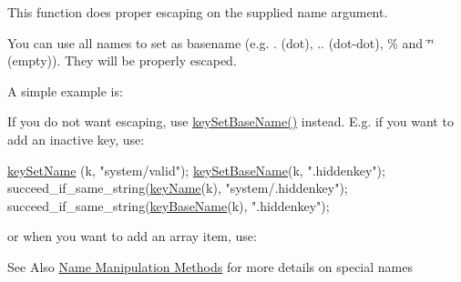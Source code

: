 This function does proper escaping on the supplied name argument.

You can use all names to set as basename (e.\-g. . (dot), .. (dot-\/dot), \% and \char`\"{}\char`\"{} (empty)). They will be properly escaped.

A simple example is\-: 
 If you do not want escaping, use \hyperlink{group__keyname_ga6e804bd453f98c28b0ff51430d1df407}{key\-Set\-Base\-Name()} instead. E.\-g. if you want to add an inactive key, use\-: 
\begin{DoxyCodeInclude}
        \hyperlink{group__keyname_ga7699091610e7f3f43d2949514a4b35d9}{keySetName} (k, \textcolor{stringliteral}{"system/valid"});
        \hyperlink{group__keyname_ga6e804bd453f98c28b0ff51430d1df407}{keySetBaseName}(k, \textcolor{stringliteral}{".hiddenkey"});
        succeed\_if\_same\_string(\hyperlink{group__keyname_ga8e805c726a60da921d3736cda7813513}{keyName}(k), \textcolor{stringliteral}{"system/.hiddenkey"});
        succeed\_if\_same\_string(\hyperlink{group__keyname_gaaff35e7ca8af5560c47e662ceb9465f5}{keyBaseName}(k), \textcolor{stringliteral}{".hiddenkey"});
\end{DoxyCodeInclude}
 or when you want to add an array item, use\-: 
 \begin{DoxySeeAlso}{See Also}
\hyperlink{group__keyname}{Name Manipulation Methods} for more details on special names
\end{DoxySeeAlso}

